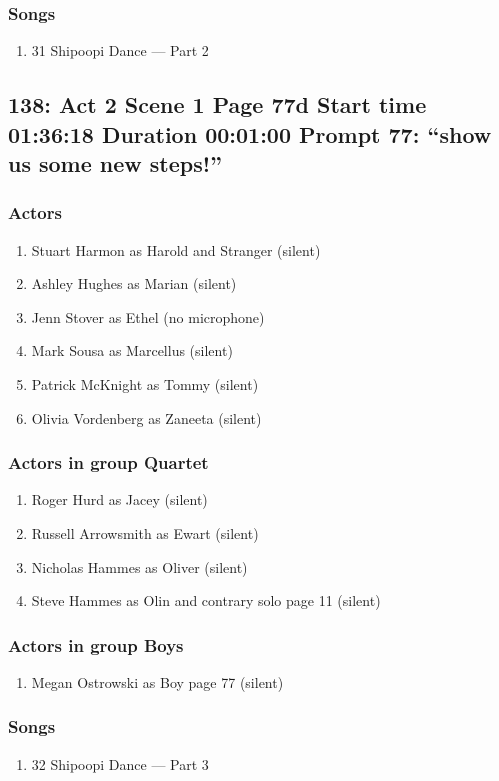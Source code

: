 \subsubsection{Songs}
\begin{enumerate}
\item 31 Shipoopi Dance --- Part 2
\end{enumerate}
\subsection{138: Act 2 Scene 1 Page 77d Start time 01:36:18 Duration 00:01:00 Prompt 77: ``show us some new steps!''}

\subsubsection{Actors}
\begin{enumerate}
\item Stuart Harmon as Harold and Stranger (silent)
\item Ashley Hughes as Marian (silent)
\item Jenn Stover as Ethel (no microphone)
\item Mark Sousa as Marcellus (silent)
\item Patrick McKnight as Tommy (silent)
\item Olivia Vordenberg as Zaneeta (silent)
\end{enumerate}
\subsubsection{Actors in group Quartet}
\begin{enumerate}
\item Roger Hurd as Jacey (silent)
\item Russell Arrowsmith as Ewart (silent)
\item Nicholas Hammes as Oliver (silent)
\item Steve Hammes as Olin and contrary solo page 11 (silent)
\end{enumerate}
\subsubsection{Actors in group Boys}
\begin{enumerate}
\item Megan Ostrowski as Boy page 77 (silent)
\end{enumerate}

\subsubsection{Songs}
\begin{enumerate}
\item 32 Shipoopi Dance --- Part 3
\end{enumerate}
